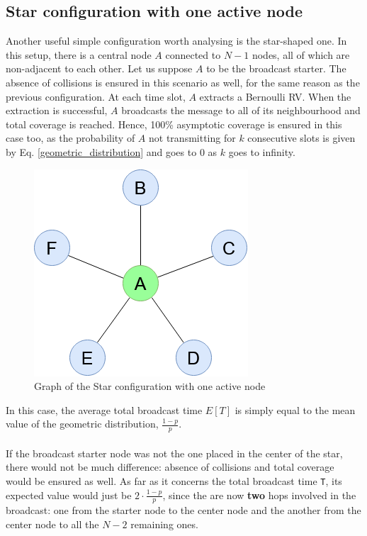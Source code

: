 \subsection{Star configuration with one active node}
Another useful simple configuration worth analysing is the star-shaped one. In
this setup, there is a central node $A$ connected to $N - 1$ nodes, all of which
are non-adjacent to each other. Let us suppose $A$ to be the broadcast starter.
The absence of collisions is ensured in this scenario as well, for the
same reason as the previous configuration.
At each time slot, $A$ extracts a Bernoulli RV. When the extraction is
successful, $A$ broadcasts the message to all of its neighbourhood and total
coverage is reached. Hence, 100\% asymptotic coverage is ensured in this case
too, as the probability of $A$ not transmitting for $k$ consecutive slots is
given by Eq. \ref{geometric_distribution} and goes to $0$ as $k$ goes to
infinity.
\begin{figure}[H]
    \begin{center}
        \includegraphics[scale=0.6]{img/star_graph.png}
        \caption{Graph of the Star configuration with one active node}
        \label{fig:single_queue}
    \end{center}
\end{figure}
\noindent
In this case, the average total broadcast time $E[T]$ is simply equal to the
mean value of the geometric distribution, $\frac{1 - p}{p}$.\\
\\
If the broadcast starter node was not the one placed in the center of the star,
there would not be much difference: absence of collisions and total coverage
would be ensured as well. As far as it concerns the total broadcast time
\texttt{T}, its expected value would just be $2 \cdot \frac{1 - p}{p}$, since
the are now \textbf{two} hops involved in the broadcast: one from the starter
node to the center node and the another from the center node to all the $N - 2$
remaining ones.
